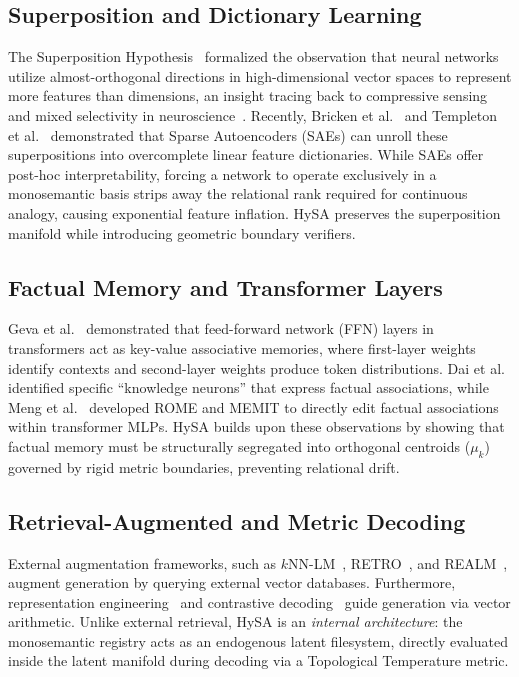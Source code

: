 \documentclass[11pt,a4paper]{article}
\theoremstyle{definition}
\begin{document}
\subsection{Superposition and Dictionary Learning}
The Superposition Hypothesis~\cite{elhage2022toy} formalized the observation that neural networks utilize almost-orthogonal directions in high-dimensional vector spaces to represent more features than dimensions, an insight tracing back to compressive sensing and mixed selectivity in neuroscience~\cite{rigotti2013importance, fusi2016why}. Recently, Bricken et al.~\cite{bricken2023monosemanticity} and Templeton et al.~\cite{templeton2024scaling} demonstrated that Sparse Autoencoders (SAEs) can unroll these superpositions into overcomplete linear feature dictionaries. While SAEs offer post-hoc interpretability, forcing a network to operate exclusively in a monosemantic basis strips away the relational rank required for continuous analogy, causing exponential feature inflation. HySA preserves the superposition manifold while introducing geometric boundary verifiers.

\subsection{Factual Memory and Transformer Layers}
Geva et al.~\cite{geva2021transformer} demonstrated that feed-forward network (FFN) layers in transformers act as key-value associative memories, where first-layer weights identify contexts and second-layer weights produce token distributions. Dai et al.~\cite{knowledge_neurons_2022} identified specific ``knowledge neurons'' that express factual associations, while Meng et al.~\cite{meng2022locating_rome, meng2022mass_memit} developed ROME and MEMIT to directly edit factual associations within transformer MLPs. HySA builds upon these observations by showing that factual memory must be structurally segregated into orthogonal centroids ($\mu_k$) governed by rigid metric boundaries, preventing relational drift.

\subsection{Retrieval-Augmented and Metric Decoding}
External augmentation frameworks, such as $k\text{NN}$-LM~\cite{khandelwal2020knn_lm}, RETRO~\cite{borgeaud2022retro}, and REALM~\cite{guu2020realm}, augment generation by querying external vector databases. Furthermore, representation engineering~\cite{zou2023representation} and contrastive decoding~\cite{li2023contrastive} guide generation via vector arithmetic. Unlike external retrieval, HySA is an \textit{internal architecture}: the monosemantic registry acts as an endogenous latent filesystem, directly evaluated inside the latent manifold during decoding via a Topological Temperature metric.
\end{document}
